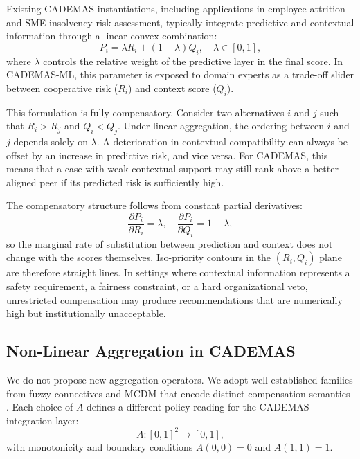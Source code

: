 \documentclass[mathematics,article,submit,moreauthors]{Definitions/mdpi}
\begin{document}
Existing CADEMAS instantiations, including applications in employee attrition and SME insolvency risk assessment, typically integrate predictive and contextual information through a linear convex combination:
\begin{equation}
P_i = \lambda R_i + (1 - \lambda) Q_i, \quad \lambda \in [0,1],
\end{equation}
where $\lambda$ controls the relative weight of the predictive layer in the final score. In CADEMAS-ML, this parameter is exposed to domain experts as a trade-off slider between cooperative risk ($R_i$) and context score ($Q_i$).

This formulation is fully compensatory. Consider two alternatives $i$ and $j$ such that $R_i > R_j$ and $Q_i < Q_j$. Under linear aggregation, the ordering between $i$ and $j$ depends solely on $\lambda$. A deterioration in contextual compatibility can always be offset by an increase in predictive risk, and vice versa. For CADEMAS, this means that a case with weak contextual support may still rank above a better-aligned peer if its predicted risk is sufficiently high.

The compensatory structure follows from constant partial derivatives:
\[
\frac{\partial P_i}{\partial R_i} = \lambda, \quad \frac{\partial P_i}{\partial Q_i} = 1 - \lambda,
\]
so the marginal rate of substitution between prediction and context does not change with the scores themselves. Iso-priority contours in the $(R_i, Q_i)$ plane are therefore straight lines. In settings where contextual information represents a safety requirement, a fairness constraint, or a hard organizational veto, unrestricted compensation may produce recommendations that are numerically high but institutionally unacceptable.

\subsection{Non-Linear Aggregation in CADEMAS}
\label{subsect:nonlinear_aggregators}

We do not propose new aggregation operators. We adopt well-established families from fuzzy connectives and MCDM that encode distinct compensation semantics \citep{Zimmermann1980,Klement1996}. Each choice of $A$ defines a different policy reading for the CADEMAS integration layer:
\begin{equation}
A: [0,1]^2 \rightarrow [0,1],
\end{equation}
with monotonicity and boundary conditions $A(0,0)=0$ and $A(1,1)=1$.
\end{document}
